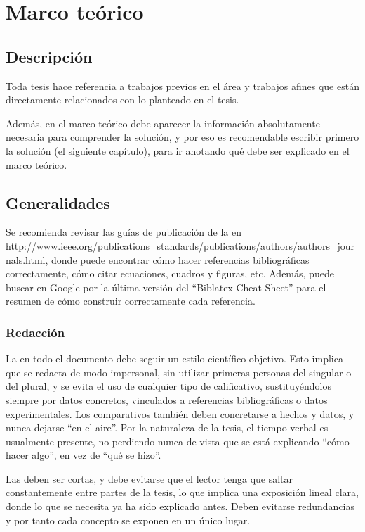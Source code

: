 \chapter{Marco teórico}
\label{ch:marco}

\section{Descripción}

Toda tesis hace referencia a trabajos previos en el área y trabajos afines que
están directamente relacionados con lo planteado en el tesis.

Además, en el marco teórico debe aparecer la información absolutamente
necesaria para comprender la solución, y por eso es recomendable escribir
primero la solución (el siguiente capítulo), para ir anotando qué debe ser
explicado en el marco teórico.

\section{Generalidades}

Se recomienda revisar las guías de publicación de la  en
\url{http://www.ieee.org/publications_standards/publications/authors/authors_journals.html},
donde puede encontrar cómo hacer referencias bibliográficas
correctamente, cómo citar ecuaciones, cuadros y figuras, etc.  Además,
puede buscar en Google por la última versión del ``Biblatex Cheat
Sheet'' para el resumen de cómo construir correctamente cada
referencia.

\subsection{Redacción}

La  en todo el documento debe seguir un estilo científico
objetivo. Esto implica que se redacta de modo impersonal, sin utilizar primeras
personas del singular o del plural, y se evita el uso de cualquier tipo de
calificativo, sustituyéndolos siempre por datos concretos, vinculados a
referencias bibliográficas o datos experimentales. Los comparativos también
deben concretarse a hechos y datos, y nunca dejarse ``en el aire''. Por la
naturaleza de la tesis, el tiempo verbal es usualmente presente, no perdiendo
nunca de vista que se está explicando ``cómo hacer algo'', en vez de ``qué se
hizo''.

Las  deben ser cortas, y debe evitarse que el lector tenga que saltar
constantemente entre partes de la tesis, lo que implica una exposición lineal
clara, donde lo que se necesita ya ha sido explicado antes. Deben evitarse
redundancias y por tanto cada concepto se exponen en un único lugar.

